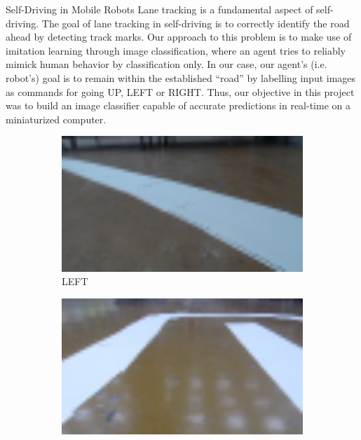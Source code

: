 \documentclass[final,hyperref={pdfpagelabels=false},notheorems]{beamer}
\theoremstyle{thesisstyle}
\newcommand{\pskip}{\vskip 0.5cm}
\begin{document}
\begin{frame}[t]
\begin{columns}[t]
\begin{column}{.5\textwidth}
    \begin{block}{Self-Driving in Mobile Robots}
      Lane tracking is a fundamental aspect of self-driving. The goal of lane tracking in
      self-driving is to correctly identify the road ahead by detecting track marks. Our approach
      to this problem is to make use of imitation learning through image classification, where an
      agent tries to reliably mimick human behavior by classification only. In our case, our
      agent's (i.e. robot's) goal is to remain within the established ``road'' by labelling input
      images as commands for going UP, LEFT or RIGHT. Thus, our objective in this project was to
      build an image classifier capable of accurate predictions in real-time on a miniaturized
      computer.\pskip

      \begin{figure}
        \begin{subfigure}{0.3\linewidth}
          \centering\includegraphics[width=1.0\textwidth]{imgs/sample_left.png}
          \captionsetup{justification=centering}
          \caption*{LEFT}
        \end{subfigure}
        \begin{subfigure}{0.3\linewidth}
          \centering\includegraphics[width=1.0\textwidth]{imgs/sample_up.png}

\end{subfigure}
\end{figure}
\end{block}
\end{column}
\end{columns}
\end{frame}
\end{document}
